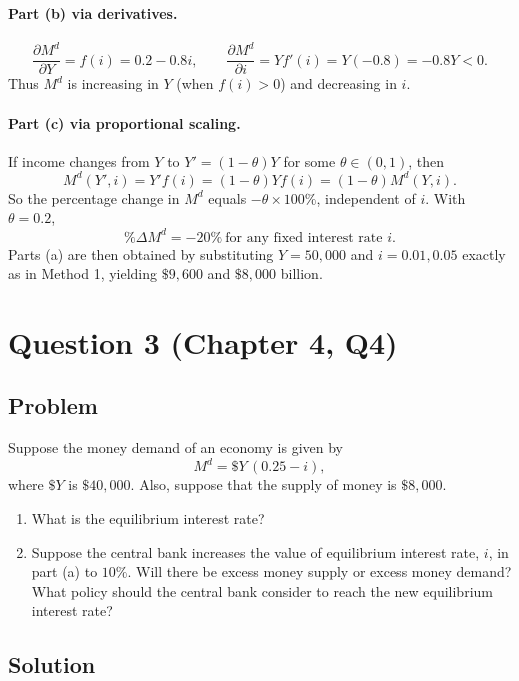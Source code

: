 \documentclass[12pt]{article}
\begin{document}
\paragraph{Part (b) via derivatives.}
\[
\frac{\partial M^d}{\partial Y}=f(i)=0.2-0.8i,
\qquad
\frac{\partial M^d}{\partial i}=Y f'(i)=Y(-0.8)=-0.8Y<0.
\]
Thus \(M^d\) is increasing in \(Y\) (when \(f(i)>0\)) and decreasing in \(i\).

\paragraph{Part (c) via proportional scaling.}
If income changes from \(Y\) to \(Y'=(1-\theta)Y\) for some \(\theta\in(0,1)\), then
\[
M^d(Y',i)=Y'f(i)=(1-\theta)Yf(i)=(1-\theta)M^d(Y,i).
\]
So the percentage change in \(M^d\) equals \(-\theta\times 100\%\), independent of \(i\). With \(\theta=0.2\),
\[
\boxed{\,\%\Delta M^d = -20\%\ \text{for any fixed interest rate }i.\,}
\]
Parts (a) are then obtained by substituting \(Y=50{,}000\) and \(i=0.01,0.05\) exactly as in Method 1, yielding \(\$9{,}600\) and \(\$8{,}000\) billion.

\newpage

\section*{Question 3 (Chapter 4, Q4)}
\subsection*{Problem}
Suppose the money demand of an economy is given by
\[
M^d = \$Y\, (0.25 - i),
\]
where \(\$Y\) is \(\$40{,}000\). Also, suppose that the supply of money is \(\$8{,}000\).
\begin{enumerate}[label=(\alph*)]
  \item What is the equilibrium interest rate?
  \item Suppose the central bank increases the value of equilibrium interest rate, \(i\), in part (a) to \(10\%\). Will there be excess money supply or excess money demand? What policy should the central bank consider to reach the new equilibrium interest rate?
\end{enumerate}

\subsection*{Solution}
\end{document}
